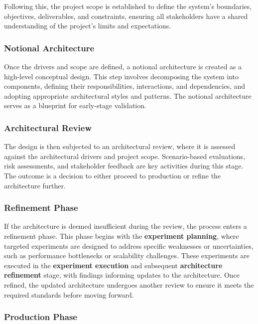 Following this, the project scope is established to define the system's boundaries, objectives, deliverables, and constraints, ensuring all stakeholders have a shared understanding of the project's limits and expectations.

\subsubsection{Notional Architecture}

Once the drivers and scope are defined, a notional architecture is created as a high-level conceptual design. This step involves decomposing the system into components, defining their responsibilities, interactions, and dependencies, and adopting appropriate architectural styles and patterns. The notional architecture serves as a blueprint for early-stage validation.

\subsubsection{Architectural Review}

The design is then subjected to an architectural review, where it is assessed against the architectural drivers and project scope. Scenario-based evaluations, risk assessments, and stakeholder feedback are key activities during this stage. The outcome is a decision to either proceed to production or refine the architecture further.

\subsubsection{Refinement Phase}

If the architecture is deemed insufficient during the review, the process enters a refinement phase. This phase begins with the \textbf{experiment planning}, where targeted experiments are designed to address specific weaknesses or uncertainties, such as performance bottlenecks or scalability challenges. These experiments are executed in the \textbf{experiment execution} and subsequent \textbf{architecture refinement} stage, with findings informing updates to the architecture. Once refined, the updated architecture undergoes another review to ensure it meets the required standards before moving forward.

\subsubsection{Production Phase}

